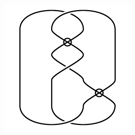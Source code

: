 \begin{figure}[H]
\begin{minipage}[b]{.18\linewidth}
\end{minipage}
\begin{minipage}[b]{.18\linewidth}
\centering
\includegraphics[width=\linewidth]{../data/virtual_3_3.png}
\end{minipage}
\end{figure}

